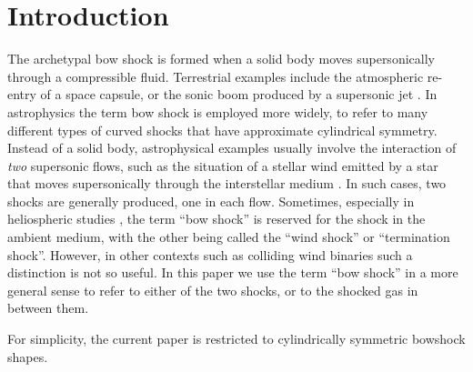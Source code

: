 \section{Introduction}
\label{sec:intro}


The archetypal bow shock is formed when a solid body moves
supersonically through a compressible fluid.  Terrestrial examples
include the atmospheric re-entry of a space capsule, or the sonic boom
produced by a supersonic jet \citep{van-Dyke:1982a}.  In astrophysics
the term bow shock is employed more widely, to refer to many different
types of curved shocks that have approximate cylindrical symmetry.
Instead of a solid body, astrophysical examples usually involve the
interaction of \emph{two} supersonic flows, such as the situation of a
stellar wind emitted by a star that moves supersonically through the
interstellar medium \citep{van-Buren:1988a, Kobulnicky:2010a,
  van-Marle:2011a, Mackey:2012b, Mackey:2015a}.  In such cases, two
shocks are generally produced, one in each flow.  Sometimes,
especially in heliospheric studies \citep{Zank:1999a, Scherer:2014a}, the
term ``bow shock'' is reserved for the shock in the ambient medium,
with the other being called the ``wind shock'' or ``termination
shock''.  However, in other contexts such as colliding wind binaries
\citep{Stevens:1992a, Gayley:2009a} such a distinction is not so
useful.  In this paper we use the term ``bow shock'' in a more general
sense to refer to either of the two shocks, or to the shocked gas in
between them. 




For simplicity, the current paper is restricted to cylindrically
symmetric bowshock shapes. 



